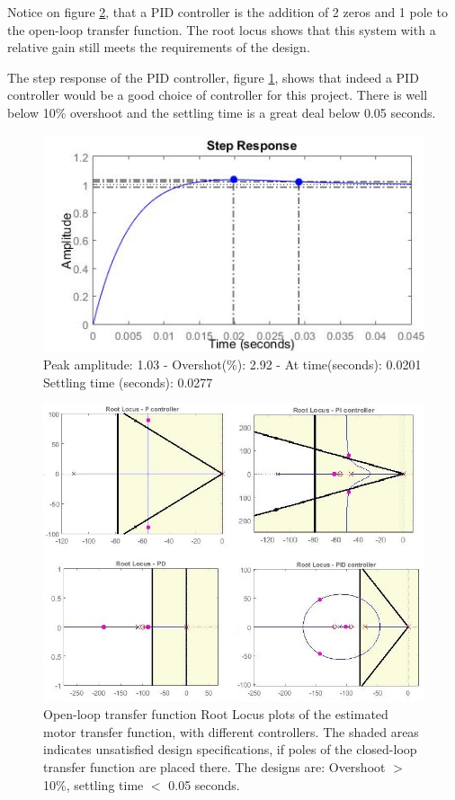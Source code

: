Notice on figure \ref{fig:RlocusControllers}, that a PID controller is the addition of 2 zeros and 1 pole to the open-loop transfer function. The root locus shows that this system with a relative gain still meets the requirements of the design.\par

The step response of the PID controller, figure \ref{fig:PIDStep}, shows that indeed a PID controller would be a good choice of controller for this project. There is well below 10\% overshoot and the settling time is a great deal below 0.05 seconds.

\begin{figure}[h!]
\centering
\includegraphics[scale=0.7]{Billeder/PIDStep.jpg}
\caption{ Peak amplitude: 1.03 - Overshot(\%): 2.92 - At time(seconds): 0.0201
		 Settling time (seconds): 0.0277 }
\label{fig:PIDStep}
\end{figure}

\begin{figure}[h!]
\centering
\includegraphics[scale=0.7]{Billeder/RlocusControllers.jpg}
\caption{ Open-loop transfer function Root Locus plots of the estimated motor transfer function, with different controllers. The shaded areas indicates unsatisfied design specifications, if poles of the closed-loop transfer function are placed there. 
The designs are: Overshoot $>$ 10\%, settling time $<$ 0.05 seconds. }
\label{fig:RlocusControllers}
\end{figure}


